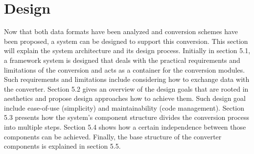 \chapter{Design}
Now that both data formats have been analyzed and conversion schemes have been proposed, a system can be designed to support this conversion. This section will explain the system architecture and its design process. Initially in section 5.1, a framework system is designed that deals with the practical requirements and limitations of the conversion and acts as a container for the conversion modules. Such requirements and limitations include considering how to exchange data with the converter. Section 5.2 gives an overview of the design goals that are rooted in aesthetics and propose design approaches how to achieve them. Such design goal include ease-of-use (simplicity) and maintainability (code management). Section 5.3 presents how the system's component structure divides the conversion process into multiple steps. Section 5.4 shows how a certain independence between those components can be achieved. Finally, the base structure of the converter components is explained in section 5.5.





